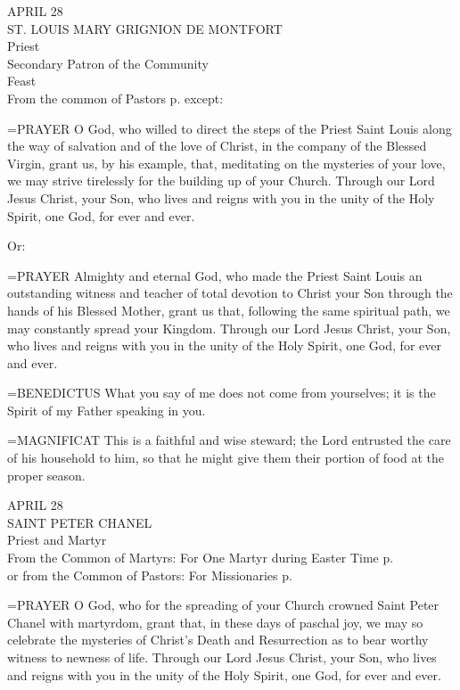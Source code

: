 \begin{center}\normalsize APRIL 28\\
\footnotesize ST. LOUIS MARY GRIGNION DE MONTFORT\\
\footnotesize Priest\\
\footnotesize Secondary Patron of the Community\\
\footnotesize Feast\\
\footnotesize From the common of Pastors p.    except:\\
\end{center}

\hangindent=\parindent \small{PRAYER 
O God, who willed to direct the steps of the Priest Saint Louis
along the way of salvation and of the love of Christ,
in the company of the Blessed Virgin,
grant us, by his example,
that, meditating on the mysteries of your love,
we may strive tirelessly for the building up of your Church.
Through our Lord Jesus Christ, your Son,
who lives and reigns with you in the unity of the Holy Spirit,
one God, for ever and ever.\\}
 
Or:

\hangindent=\parindent \small{PRAYER 
Almighty and eternal God, who made the Priest Saint Louis
an outstanding witness and teacher
of total devotion to Christ your Son
through the hands of his Blessed Mother,
grant us that, following the same spiritual path,
we may constantly spread your Kingdom.
Through our Lord Jesus Christ, your Son,
who lives and reigns with you in the unity of the Holy Spirit,
one God, for ever and ever.\\}
 
\hangindent=\parindent \small{BENEDICTUS  What you say of me does not come from yourselves; it is
the Spirit of my Father speaking in you.\\}
 
\hangindent=\parindent \small{MAGNIFICAT  This is a faithful and wise steward; the Lord entrusted
the care of his household to him, so that he might give them their
portion of food at the proper season.\\}
 
\begin{center}\normalsize APRIL 28\\
\footnotesize SAINT PETER CHANEL\\
\footnotesize Priest and Martyr\\
\footnotesize From the Common of Martyrs: For One Martyr during Easter Time p.   \\
\footnotesize or from the Common of Pastors: For Missionaries p.\\
\end{center}

\hangindent=\parindent \small{PRAYER 
O God, who for the spreading of your Church
crowned Saint Peter Chanel with martyrdom,
grant that, in these days of paschal joy,
we may so celebrate the mysteries of Christ's Death and Resurrection
as to bear worthy witness to newness of life.
Through our Lord Jesus Christ, your Son,
who lives and reigns with you in the unity of the Holy Spirit,
one God, for ever and ever.\\}
 
